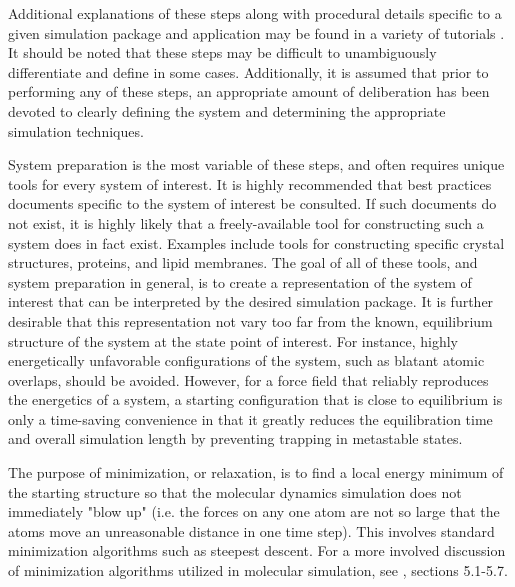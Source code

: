 \documentclass[9pt,bestpractices]{livecoms}
\begin{document}
Additional explanations of these steps along with procedural details specific to a given simulation package and application may be found in a variety of tutorials \citep{LemkulTutorials} \citep{AmberBeginner}. 
It should be noted that these steps may be difficult to unambiguously differentiate and define in some cases. 
Additionally, it is assumed that prior to performing any of these steps, an appropriate amount of deliberation has been devoted to clearly defining the system and determining the appropriate simulation techniques. 

System preparation is the most variable of these steps, and often requires unique tools for every system of interest. 
It is highly recommended that best practices documents specific to the system of interest be consulted. 
If such documents do not exist, it is highly likely that a freely-available tool for constructing such a system does in fact exist. 
Examples include tools for constructing specific crystal structures, proteins, and lipid membranes. %
The goal of all of these tools, and system preparation in general, is to create a representation of the system of interest that can be interpreted by the desired simulation package. 
It is further desirable that this representation not vary too far from the known, equilibrium structure of the system at the state point of interest. 
For instance, highly energetically unfavorable configurations of the system, such as blatant atomic overlaps, should be avoided. 
However, for a force field that reliably reproduces the energetics of a system, a starting configuration that is close to equilibrium is only a time-saving convenience in that it greatly reduces the equilibration time and overall simulation length by preventing trapping in metastable states.

The purpose of minimization, or relaxation, is to find a local energy minimum of the starting structure so that the molecular dynamics simulation does not immediately "blow up" (i.e. the forces on any one atom are not so large that the atoms move an unreasonable distance in one time step). 
This involves standard minimization algorithms such as steepest descent. 
For a more involved discussion of minimization algorithms utilized in molecular simulation, see \citet{LeachBook}, sections 5.1-5.7.
\end{document}

